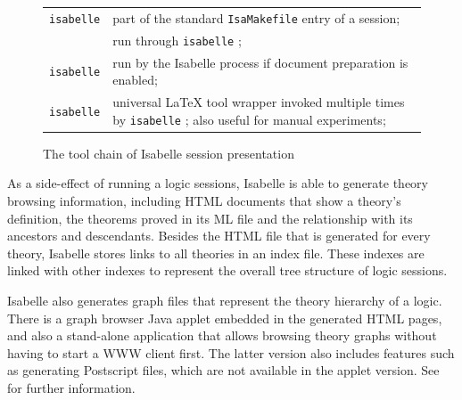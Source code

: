 \begin{isabellebody}
\begin{isamarkuptext}
\begin{figure}[htbp]
\begin{center}
\begin{tabular}{lp{}}
      \verb|isabelle| \hyperlink{tool.usedir}{\mbox{\isa{\isatt{usedir}}}} & part of the standard
      \verb|IsaMakefile| entry of a session; \\

      \hyperlink{executable.isabelle-process}{\mbox{\isa{\isatt{isabelle{\isaliteral{2D}{\isacharminus}}process}}}} & run through \verb|isabelle| \indexref{}{tool}{usedir}\hyperlink{tool.usedir}{\mbox{\isa{\isatt{usedir}}}}; \\

      \verb|isabelle| \indexref{}{tool}{document}\hyperlink{tool.document}{\mbox{\isa{\isatt{document}}}} & run by the Isabelle
      process if document preparation is enabled; \\

      \verb|isabelle| \indexref{}{tool}{latex}\hyperlink{tool.latex}{\mbox{\isa{\isatt{latex}}}} & universal {\LaTeX} tool
      wrapper invoked multiple times by \verb|isabelle| \indexref{}{tool}{document}\hyperlink{tool.document}{\mbox{\isa{\isatt{document}}}}; also useful for manual experiments; \\

  \end{tabular}
  \caption{The tool chain of Isabelle session presentation} \label{fig:session-tools}
  \end{center}
  \end{figure}%
\end{isamarkuptext}%
\isamarkuptrue%
%
\isamarkuptrue%
%
\begin{isamarkuptext}%

  As a side-effect of running a logic sessions, Isabelle is able to
  generate theory browsing information, including HTML documents that
  show a theory's definition, the theorems proved in its ML file and
  the relationship with its ancestors and descendants.  Besides the
  HTML file that is generated for every theory, Isabelle stores links
  to all theories in an index file. These indexes are linked with
  other indexes to represent the overall tree structure of logic
  sessions.

  Isabelle also generates graph files that represent the theory
  hierarchy of a logic.  There is a graph browser Java applet embedded
  in the generated HTML pages, and also a stand-alone application that
  allows browsing theory graphs without having to start a WWW client
  first.  The latter version also includes features such as generating
  Postscript files, which are not available in the applet version.
  See  for further information.


\end{isamarkuptext}
\end{isabellebody}
